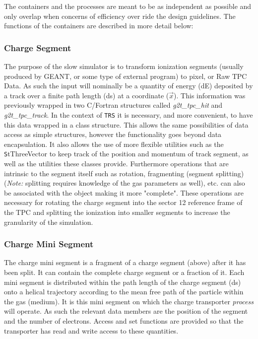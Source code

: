 \documentclass[twoside]{article}
\newcommand{\comp}[1]{\texttt{#1}}%
\begin{document}
The containers and the processes are meant to be as independent
as possible and only overlap when concerns of efficiency over ride
the design guidelines.  The functions of the containers are described
in more detail below:

\subsubsection{Charge Segment}
\label{sec:chargeSegment}

The purpose of the slow simulator is to transform ionization
segments (usually produced by GEANT, or some type of external program)
to pixel, or Raw TPC Data.  As such the input will nominally
be a quantity of energy (dE) deposited by a track over a finite
path length (ds) at a coordinate ($\vec{x}$).  This information was
previously wrapped in two C/Fortran structures called {\em g2t\_tpc\_hit}
and {\em g2t\_tpc\_track}.  In the context of \comp{TRS} it is necessary, and
more convenient, to have this data wrapped in a class structure.  This
allows the same possibilities of data access as simple structures, however
the functionality goes beyond data encapsulation.  It also allows the
use of more flexible utilities such as the {\texttt StThreeVector} to
keep track of the position and momentum of track segment, as well as the
utilities these classes provide.  Furthermore operations that are
intrinsic to the segment itself such as rotation, fragmenting
(segment splitting) ({\em Note:} splitting requires knowledge
of the gas parameters as well), etc. can also be associated with
the object making
it more "complete".  These operations are necessary for rotating the
charge segment into the sector 12 reference frame of the TPC and
splitting the ionization into smaller segments to increase the granularity
of the simulation.

\subsubsection{Charge Mini Segment}
\label{sec:chargeMiniSegment}

The charge mini segment is a fragment of a charge segment (above) after it
has been split.  It can contain the complete charge segment or a 
fraction of it.  Each mini segment is distributed within the path length
of the charge segment (ds) onto a helical trajectory according to
the mean free path of the particle within the gas (medium).  
It is this mini segment on which
the charge transporter {\em process} will operate.  As such the relevant
data members are the position of the segment and the number of electrons.
Access and set functions are provided so that the transporter has read and
write access to these quantities.  
\end{document}
